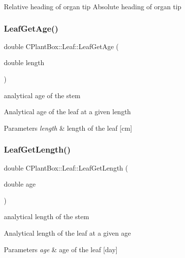 Relative heading of organ tip Absolute heading of organ tip \mbox{\label{classCPlantBox_1_1Leaf_a9939b2ee6247b9354dbe6d6c16d3442e}} 
\subsubsection{\texorpdfstring{Leaf\+Get\+Age()}{LeafGetAge()}}
{\footnotesize\ttfamily double C\+Plant\+Box\+::\+Leaf\+::\+Leaf\+Get\+Age (\begin{DoxyParamCaption}\item[{double}]{length }\end{DoxyParamCaption})}



analytical age of the stem 

Analytical age of the leaf at a given length


\begin{DoxyParams}{Parameters}
{\em length} & length of the leaf \mbox{[}cm\mbox{]} \\
\hline
\end{DoxyParams}
\mbox{\label{classCPlantBox_1_1Leaf_a7056b1a0b28172daa7ce5e69b2f6c435}} 
\subsubsection{\texorpdfstring{Leaf\+Get\+Length()}{LeafGetLength()}}
{\footnotesize\ttfamily double C\+Plant\+Box\+::\+Leaf\+::\+Leaf\+Get\+Length (\begin{DoxyParamCaption}\item[{double}]{age }\end{DoxyParamCaption})}



analytical length of the stem 

Analytical length of the leaf at a given age


\begin{DoxyParams}{Parameters}
{\em age} & age of the leaf \mbox{[}day\mbox{]} \\
\hline
\end{DoxyParams}
\mbox{\label{classCPlantBox_1_1Leaf_ac8f35a92020107f44059b995e44af5d6}} 
